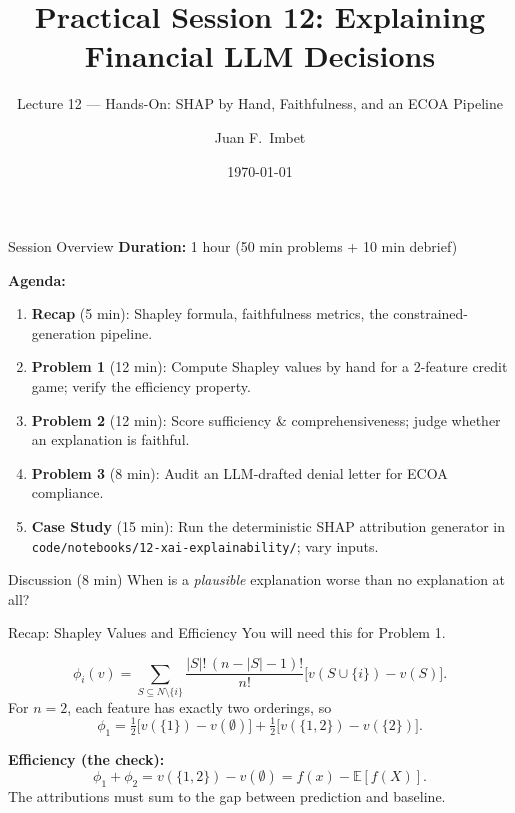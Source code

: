 \documentclass[9pt,t]{beamer}
\title{Practical Session 12: Explaining Financial LLM Decisions}
\subtitle{Lecture 12 --- Hands-On: SHAP by Hand, Faithfulness, and an ECOA Pipeline}
\author{Juan F.\ Imbet}
\institute{Paris Dauphine -- PSL University}
\date{\today}
\begin{document}
\begin{frame}\titlepage\end{frame}

\begin{frame}{Session Overview}
\textbf{Duration:} 1 hour (50 min problems + 10 min debrief)

\medskip
\textbf{Agenda:}
\begin{enumerate}
  \item \textbf{Recap} (5 min): Shapley formula, faithfulness metrics, the
        constrained-generation pipeline.
  \item \textbf{Problem 1} (12 min): Compute Shapley values by hand for a 2-feature
        credit game; verify the efficiency property.
  \item \textbf{Problem 2} (12 min): Score sufficiency \& comprehensiveness; judge
        whether an explanation is faithful.
  \item \textbf{Problem 3} (8 min): Audit an LLM-drafted denial letter for ECOA
        compliance.
  \item \textbf{Case Study} (15 min): Run the deterministic SHAP attribution
        generator in \texttt{code/notebooks/12-xai-explainability/}; vary inputs.
\end{enumerate}

\medskip
\begin{block}{Discussion (8 min)}
When is a \emph{plausible} explanation worse than no explanation at all?
\end{block}
\end{frame}

\begin{frame}{Recap: Shapley Values and Efficiency}
You will need this for Problem 1.

\begin{underhood}
\[
\phi_i(v) = \sum_{S \subseteq N \setminus \{i\}}
\frac{|S|!\,(n-|S|-1)!}{n!}\bigl[v(S \cup \{i\}) - v(S)\bigr].
\]
For $n=2$, each feature has exactly two orderings, so
\[
\phi_1 = \tfrac{1}{2}\bigl[v(\{1\})-v(\emptyset)\bigr]
       + \tfrac{1}{2}\bigl[v(\{1,2\})-v(\{2\})\bigr].
\]
\end{underhood}

\medskip
\textbf{Efficiency (the check):}
\[
\phi_1 + \phi_2 = v(\{1,2\}) - v(\emptyset) = f(x) - \mathbb{E}[f(X)].
\]
The attributions must sum to the gap between prediction and baseline.
\end{frame}
\end{document}
